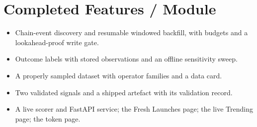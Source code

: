 \section{Completed Features / Module}
\begin{itemize}
  \item Chain-event discovery and resumable windowed backfill, with budgets and a lookahead-proof write gate.
  \item Outcome labels with stored observations and an offline sensitivity sweep.
  \item A properly sampled dataset with operator families and a data card.
  \item Two validated signals and a shipped artefact with its validation record.
  \item A live scorer and FastAPI service; the Fresh Launches page; the live Trending page; the token page.
\end{itemize}

